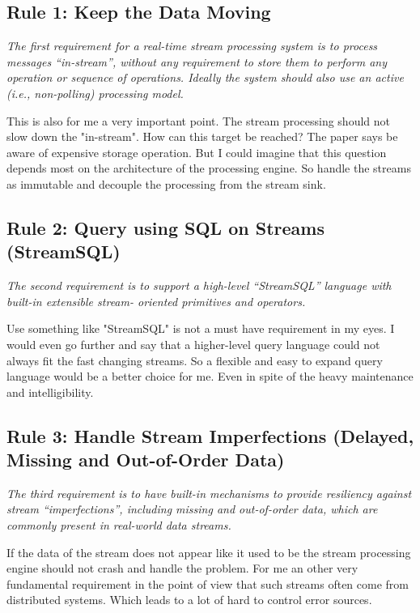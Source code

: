 \subsection{Rule 1: Keep the Data Moving}
\textit{The first requirement for a real-time stream processing
        system is to process messages “in-stream”, without any
        requirement to store them to perform any operation or
        sequence of operations. Ideally the system should also use
        an active (i.e., non-polling) processing model.}

\medskip
This is also for me a very important point. The stream processing should not slow down the "in-stream".
How can this target be reached? The paper says be aware of expensive storage operation.
But I could imagine that this question depends most on the architecture of the processing engine.
So handle the streams as immutable and decouple the processing from the stream sink.


\subsection{Rule 2: Query using SQL on Streams (StreamSQL)}
\textit{The second requirement is to support a high-level
        “StreamSQL” language with built-in extensible stream-
        oriented primitives and operators.}

\medskip
Use something like "StreamSQL" is not a must have requirement in my eyes.
I would even go further and say that a higher-level query language could not always fit the fast changing streams.
So a flexible and easy to expand query language would be a better choice for me.
Even in spite of the heavy maintenance and intelligibility.

\subsection{Rule 3: Handle Stream Imperfections (Delayed, Missing
and Out-of-Order Data)}
\textit{The third requirement is to have built-in mechanisms to
        provide resiliency against stream “imperfections”,
        including missing and out-of-order data, which are
        commonly present in real-world data streams.}

\medskip
If the data of the stream does not appear like it used to be the stream processing engine should not crash and handle the problem.
For me an other very fundamental requirement in the point of view that such streams often come from distributed systems.
Which leads to a lot of hard to control error sources.


